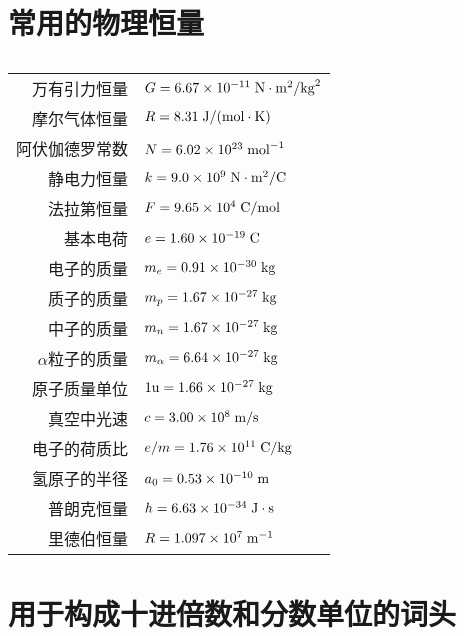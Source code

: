 \chapter{常用的物理恒量}
\begin{table}[htbp]
	\centering
	\caption{}\label{tab_C_10-2}
    \begin{tabular}{rl}
        万有引力恒量&    $G=6.67\times10^{-11}\; {\rm N}\cdot {\rm m^2}/{\rm kg}^2$\\
        摩尔气体恒量&    $R=8.31\;  {\rm J}/({\rm mol}\cdot {\rm K})$\\
        阿伏伽德罗常数&    $N=6.02\times 10^{23}\; {\rm mol}^{-1}$\\
        静电力恒量&    $k=9.0\times10^9\;  {\rm N}\cdot {\rm m^2}/{\rm C}$\\
        法拉第恒量&    $F=9.65\times10^4\;  {\rm C}/{\rm mol}$\\
        基本电荷&    $e=1.60\times10^{-19}\;  {\rm C}$\\
        电子的质量&    $m_e=0.91\times10^{-30}\; {\rm kg}$\\
        质子的质量&    $m_p=1.67\times10^{-27}\;   {\rm kg}$\\
        中子的质量&    $m_n=1.67\times10^{-27} \;   {\rm kg}$\\
        $\alpha$粒子的质量&    $m_{\alpha}=6.64\times10^{-27} \;  {\rm kg}$\\
        原子质量单位&    $1{\rm u}=1.66\times10^{-27} \;   {\rm kg}$\\
        真空中光速&    $c=3.00\times10^8 \;\text{m}/\text{s}$\\
        电子的荷质比&    $e/m=1.76\times10^{11}\; {\rm C}/{\rm kg}$ \\
        氢原子的半径&    $a_0=0.53\times10^{-10}\; {\rm m}$   \\
        普朗克恒量&    $h=6.63\times10^{-34}\;  {\rm J}\cdot {\rm s}$   \\
        里德伯恒量&    $R=1.097\times10^7\;  {\rm m}^{-1}$\\        
    \end{tabular}
\end{table}

\chapter{用于构成十进倍数和分数单位的词头}

